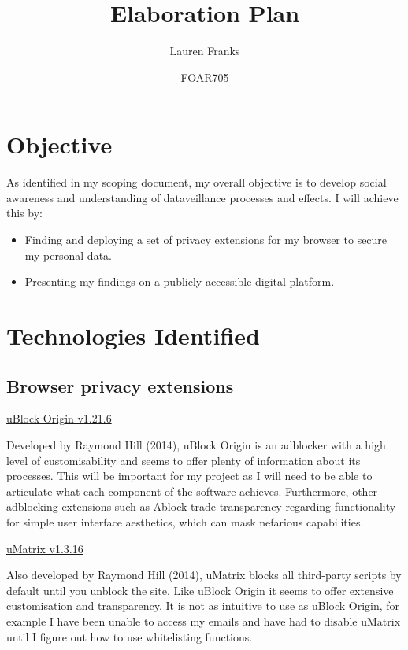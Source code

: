 \documentclass{article}
\title{Elaboration Plan}
\author{Lauren Franks}
\date{FOAR705}
\begin{document}
\maketitle
\tableofcontents
\section{Objective}

As identified in my scoping document, my overall objective is to develop social awareness and understanding of dataveillance processes and effects. I will achieve this by:
\begin{itemize}
\item Finding and deploying a set of privacy extensions for my browser to secure my personal data.
\item Presenting my findings on a publicly accessible digital platform.
\end{itemize}

\section{Technologies Identified}
\subsection{Browser privacy extensions}

 
\href{https://github.com/gorhill/uBlock}{uBlock Origin v1.21.6}

Developed by Raymond Hill (2014), uBlock Origin is an adblocker with a high level of customisability and seems to offer plenty of information about its processes. This will be important for my project as I will need to be able to articulate what each component of the software achieves. Furthermore, other adblocking extensions such as \href{https://getadblock.com/}{Ablock} trade transparency regarding functionality for simple user interface aesthetics, which can mask nefarious capabilities.\newline


\noindent\href{https://github.com/gorhill/uMatrix}{uMatrix v1.3.16}

Also developed by Raymond Hill (2014), uMatrix blocks all third-party scripts by default until you unblock the site. Like uBlock Origin it seems to offer extensive customisation and transparency. It is not as intuitive to use as uBlock Origin, for example I have been unable to access my emails and have had to disable uMatrix until I figure out how to use whitelisting functions.\newline
\end{document}
